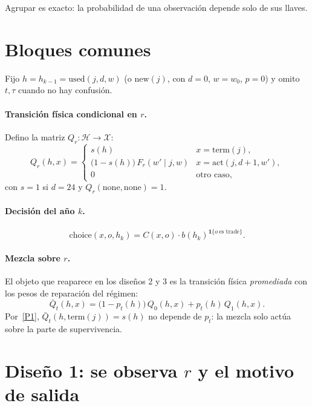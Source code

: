 \documentclass[11pt]{article}
\newcommand{\act}{\mathrm{act}}
\newcommand{\term}{\mathrm{term}}
\newcommand{\none}{\mathrm{none}}
\newcommand{\used}{\mathrm{used}}
\newcommand{\new}{\mathrm{new}}
\newcommand{\buy}{b}
\newcommand{\1}{\mathbf{1}}
\newcommand{\Qbar}{\bar Q}
\begin{document}
Agrupar es exacto: la probabilidad de una observación depende solo de sus llaves.

\section{Bloques comunes}

Fijo $h=h_{k-1}=\used(j,d,w)$ (o $\new(j)$, con $d=0$, $w=w_0$, $p=0$) y omito $t,\tau$
cuando no hay confusión.

\paragraph{Transición física condicional en $r$.} Defino la matriz
$Q_r:\mathcal H\to\mathcal X$:
\begin{equation}\label{eq:Qr}
  Q_r(h,x)=
  \begin{cases}
    s(h) & x=\term(j),\\
    \bigl(1-s(h)\bigr)\,F_r(w'\mid j,w) & x=\act(j,d+1,w'),\\
    0 & \text{otro caso,}
  \end{cases}
\end{equation}
con $s=1$ si $d=24$ y $Q_r(\none,\none)=1$.

\paragraph{Decisión del año $k$.}
\[
  \text{choice}(x,o,h_k)=C(x,o)\cdot \buy(h_k)^{\1\{o\ \text{es trade}\}}.
\]

\paragraph{Mezcla sobre $r$.} El objeto que reaparece en los diseños 2 y 3 es la transición
física \emph{promediada} con los pesos de reparación del régimen:
\begin{equation}\label{eq:Qbar}
  \boxed{\;\Qbar_t(h,x)=\bigl(1-p_t(h)\bigr)\,Q_0(h,x)+p_t(h)\,Q_1(h,x).\;}
\end{equation}
Por~\ref{P1}, $\Qbar_t(h,\term(j))=s(h)$ no depende de $p_t$: la mezcla solo actúa sobre
la parte de supervivencia.

\section{Diseño 1: se observa $r$ y el motivo de salida}
\end{document}
